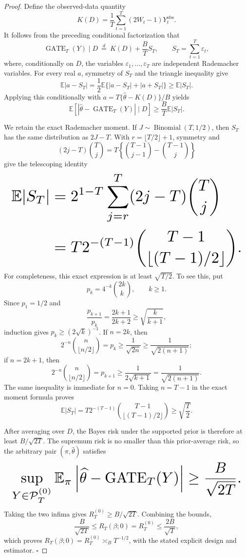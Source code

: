 \documentclass{article}
\begin{document}
\begin{proof}
Define the observed-data quantity
\[
K(D)=\frac1T\sum_{t=1}^T(2W_t-1)Y_t^{\mathrm{obs}}.
\]
It follows from the preceding conditional factorization that
\[
\operatorname{GATE}_T(Y)\mid D
\ \overset{d}{=}\ K(D)+\frac BT S_T,
\qquad
S_T=\sum_{t=1}^T\varepsilon_t,
\]
where, conditionally on \(D\), the variables \(\varepsilon_1,\ldots,\varepsilon_T\) are independent Rademacher variables. For every real \(a\), symmetry of \(S_T\) and the triangle inequality give
\[
\mathbb E|a-S_T|
=\frac12\mathbb E\{|a-S_T|+|a+S_T|\}
\ge \mathbb E|S_T|.
\]
Applying this conditionally with \(a=T\{\widehat\theta-K(D)\}/B\) yields
\[
\mathbb E\left[\left|\widehat\theta-\operatorname{GATE}_T(Y)\right|\mid D\right]
\ge \frac BT\mathbb E|S_T|.
\]

We retain the exact Rademacher moment. If \(J\sim\operatorname{Binomial}(T,1/2)\), then \(S_T\) has the same distribution as \(2J-T\). With \(r=\lfloor T/2\rfloor+1\), symmetry and
\[
(2j-T)\binom Tj
=T\left\{\binom{T-1}{j-1}-\binom{T-1}{j}\right\}
\]
give the telescoping identity
\[
\makebox[\linewidth][c]{\resizebox{0.98\linewidth}{!}{\(\displaystyle \begin{aligned}
\mathbb E|S_T|
&=2^{1-T}\sum_{j=r}^T(2j-T)\binom Tj\\
&=T2^{-(T-1)}\binom{T-1}{\lfloor (T-1)/2\rfloor}.
\end{aligned}\)}}
\]
For completeness, this exact expression is at least \(\sqrt{T/2}\). To see this, put
\[
p_k=4^{-k}\binom{2k}{k},\qquad k\ge1.
\]
Since \(p_1=1/2\) and
\[
\frac{p_{k+1}}{p_k}=\frac{2k+1}{2k+2}\ge\sqrt{\frac{k}{k+1}},
\]
induction gives \(p_k\ge(2\sqrt{k})^{-1}\). If \(n=2k\), then
\[
2^{-n}\binom n{\lfloor n/2\rfloor}=p_k\ge\frac1{\sqrt{2n}}\ge\frac1{\sqrt{2(n+1)}};
\]
if \(n=2k+1\), then
\[
2^{-n}\binom n{\lfloor n/2\rfloor}=p_{k+1}\ge\frac1{2\sqrt{k+1}}=\frac1{\sqrt{2(n+1)}}.
\]
The same inequality is immediate for \(n=0\). Taking \(n=T-1\) in the exact moment formula proves
\[
\mathbb E|S_T|
=T2^{-(T-1)}\binom{T-1}{\lfloor (T-1)/2\rfloor}
\ge\sqrt{\frac T2}.
\]

After averaging over \(D\), the Bayes risk under the supported prior is therefore at least \(B/\sqrt{2T}\). The supremum risk is no smaller than this prior-average risk, so the arbitrary pair \((\pi,\widehat\theta)\) satisfies
\[
\makebox[\linewidth][c]{\resizebox{0.98\linewidth}{!}{\(\displaystyle \sup_{Y\in\mathcal P_T^{(0)}}
\mathbb E_\pi\left|\widehat\theta-\operatorname{GATE}_T(Y)\right|
\ge\frac{B}{\sqrt{2T}}.\)}}
\]
Taking the two infima gives \(R_T^{(0)}\ge B/\sqrt{2T}\). Combining the bounds,
\[
\frac{B}{\sqrt{2T}}
\le R_T(\beta;0)=R_T^{(0)}
\le\frac{2B}{\sqrt T},
\]
which proves \(R_T(\beta;0)=R_T^{(0)}\asymp_B T^{-1/2}\), with the stated explicit design and estimator. \(\square\)
\end{proof}
\end{document}
